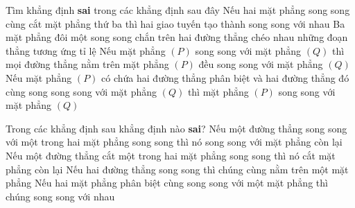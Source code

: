 \begin{ex}%
	Tìm khẳng định \textbf{sai} trong các khẳng định  sau đây
	 \choice
		{Nếu hai mặt phẳng song song cùng cắt mặt phẳng thứ ba thì hai giao tuyến  tạo thành song song với nhau}
		{Ba mặt phẳng đôi một song song chắn trên hai đường thẳng  chéo nhau những đoạn thẳng tương ứng tỉ lệ}
		 {Nếu mặt phẳng $\left(P\right)$ song song với mặt phẳng $\left(Q\right)$ thì mọi đường thẳng nằm trên mặt phẳng $\left(P\right)$ đều song song với mặt phẳng $\left(Q\right)$}
		{\True Nếu mặt  phẳng $\left(P\right)$ có chứa hai đường thẳng phân biệt và hai đường thẳng đó cùng song song song với mặt phẳng $\left(Q\right)$ thì mặt phẳng $\left(P\right)$ song song với mặt phẳng $\left(Q\right)$}
\end{ex}

\begin{ex}%
	Trong các khẳng định  sau khẳng định nào \textbf{sai}?
	 \choice
		 {\True Nếu một đường thẳng song song với một trong hai mặt phẳng song song thì nó song song với mặt phẳng còn lại}
		{Nếu một đường thẳng cắt một trong hai mặt phẳng song song thì nó cắt  mặt phẳng còn lại}
		{Nếu hai đường thẳng song song thì chúng cùng nằm trên một mặt  phẳng}
		{Nếu hai mặt phẳng phân biệt cùng song song với một mặt phẳng thì chúng  song song với nhau}
\end{ex}


